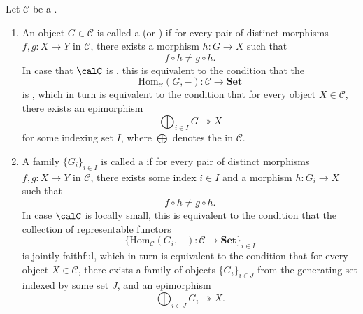 \begin{definition} \label{definition:generator_of_a_category}
Let $\mathcal{C}$ be a . 
\begin{enumerate}
    \item  An object $G \in \mathcal{C}$ is called a  (or ) if for every pair of distinct morphisms $f, g : X \to Y$ in $\mathcal{C}$, there exists a morphism $h : G \to X$ such that
    $$f \circ h \neq g \circ h.$$
    In case that $\calC$ is , this is equivalent to the condition that the 
    $$\mathrm{Hom}_{\mathcal{C}}(G, -) : \mathcal{C} \to \mathbf{Set}$$
    is , 
    which in turn is equivalent to the condition that for every object $X \in \mathcal{C}$, there exists an epimorphism
    $$\bigoplus_{i \in I} G \twoheadrightarrow X$$
    for some indexing set $I$, where $\bigoplus$ denotes the  in $\mathcal{C}$.

    \item A family $\{G_i\}_{i \in I}$ is called a  if for every pair of distinct morphisms $f, g : X \to Y$ in $\mathcal{C}$, there exists some index $i \in I$ and a morphism $h : G_i \to X$ such that
    $$f \circ h \neq g \circ h.$$
    In case $\calC$ is locally small, this is equivalent to the condition that the collection of representable functors
    $$\{\mathrm{Hom}_{\mathcal{C}}(G_i, -) : \mathcal{C} \to \mathbf{Set}\}_{i \in I}$$
    is jointly faithful, which in turn is equivalent to the condition that for every object $X \in \mathcal{C}$, there exists a family of objects $\{G_i\}_{i \in J}$ from the generating set indexed by some set $J$, and an epimorphism
    $$\bigoplus_{i \in J} G_i \twoheadrightarrow X.$$

\end{enumerate}
\end{definition}